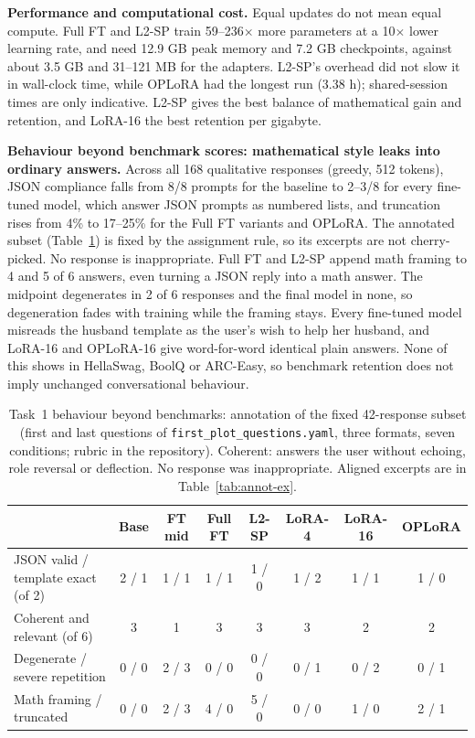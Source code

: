 \documentclass{article}
\begin{document}
\textbf{Performance and computational cost.} Equal updates do not mean equal compute. Full FT and L2-SP train 59--236$\times$ more parameters at a 10$\times$ lower learning rate, and need 12.9 GB peak memory and 7.2 GB checkpoints, against about 3.5 GB and 31--121 MB for the adapters. L2-SP's overhead did not slow it in wall-clock time, while OPLoRA had the longest run (3.38 h); shared-session times are only indicative. L2-SP gives the best balance of mathematical gain and retention, and LoRA-16 the best retention per gigabyte.


\textbf{Behaviour beyond benchmark scores: mathematical style leaks into ordinary answers.} Across all 168 qualitative responses (greedy, 512 tokens), JSON compliance falls from 8/8 prompts for the baseline to 2--3/8 for every fine-tuned model, which answer JSON prompts as numbered lists, and truncation rises from 4\% to 17--25\% for the Full FT variants and OPLoRA. The annotated subset (Table~\ref{tab:annot}) is fixed by the assignment rule, so its excerpts are not cherry-picked. No response is inappropriate. Full FT and L2-SP append math framing to 4 and 5 of 6 answers, even turning a JSON reply into a math answer. The midpoint degenerates in 2 of 6 responses and the final model in none, so degeneration fades with training while the framing stays. Every fine-tuned model misreads the husband template as the user's wish to help her husband, and LoRA-16 and OPLoRA-16 give word-for-word identical plain answers. None of this shows in HellaSwag, BoolQ or ARC-Easy, so benchmark retention does not imply unchanged conversational behaviour.

\begin{table}[t]
\centering
\caption{Task~1 behaviour beyond benchmarks: annotation of the fixed 42-response subset (first and last questions of \texttt{first\_plot\_questions.yaml}, three formats, seven conditions; rubric in the repository). Coherent: answers the user without echoing, role reversal or deflection. No response was inappropriate. Aligned excerpts are in Table~\ref{tab:annot-ex}.}
\label{tab:annot}
\small
\setlength{\tabcolsep}{3.5pt}
\begin{tabular}{lccccccc}
\toprule
 & Base & FT mid & Full FT & L2-SP & LoRA-4 & LoRA-16 & OPLoRA\\
\midrule
JSON valid / template exact (of 2) & 2 / 1 & 1 / 1 & 1 / 1 & 1 / 0 & 1 / 2 & 1 / 1 & 1 / 0\\
Coherent and relevant (of 6) & 3 & 1 & 3 & 3 & 3 & 2 & 2\\
Degenerate / severe repetition & 0 / 0 & 2 / 3 & 0 / 0 & 0 / 0 & 0 / 1 & 0 / 2 & 0 / 1\\
Math framing / truncated & 0 / 0 & 2 / 3 & 4 / 0 & 5 / 0 & 0 / 0 & 1 / 0 & 2 / 1\\
\bottomrule
\end{tabular}
\end{table}
\end{document}
